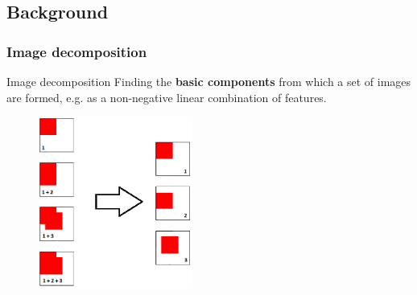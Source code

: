 \documentclass{beamer}
\begin{document}
		\subsection{Background}
			\begin{frame}
				\frametitle{Image decomposition}
				\begin{block}{Image decomposition}
					Finding the \textbf{basic components} from which a set of images are formed, e.g. as a non-negative linear combination of features.
				\end{block}
				\begin{figure}[h]
					\centering
					\includegraphics[width=0.45\textwidth]{decomposition}
				\end{figure}
			\end{frame}
\end{document}
